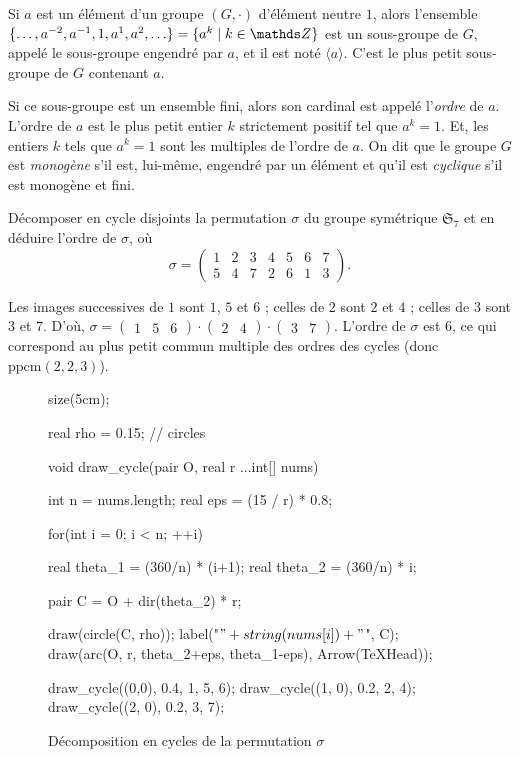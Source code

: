 Si $a$ est un élément d'un groupe $(G, \cdot)$ d'élément neutre $1$, alors l'ensemble  $\{\ldots, a^{-2}, a^{-1}, 1, a^1, a^2, \ldots\} = \{a^k  \mid k \in \Z\}$ est un sous-groupe de $G$, appelé le sous-groupe engendré par $a$, et il est noté $\langle a\rangle$. C'est le plus petit sous-groupe de $G$ contenant $a$.

Si ce sous-groupe est un ensemble fini, alors son cardinal est appelé l'\textit{ordre} de $a$. L'ordre de $a$ est le plus petit entier $k$ strictement positif tel que $a^k = 1$. Et, les entiers $k$ tels que $a^k = 1$ sont les multiples de l'ordre de $a$. On dit que le groupe $G$ est \textit{monogène} s'il est, lui-même, engendré par un élément et qu'il est \textit{cyclique} s'il est monogène et fini.

\begin{exo}
	\begin{slshape}
		Décomposer en cycle disjoints la permutation $\sigma$ du groupe symétrique $\mathfrak{S}_7$ et en déduire l'ordre de $\sigma$, où \[
			\sigma = \begin{pmatrix}
				1 & 2 & 3 & 4 & 5 & 6 & 7\\
				5 & 4 & 7 & 2 & 6 & 1 & 3
			\end{pmatrix}
		.\]
	\end{slshape}

	Les images successives de $1$ sont $1$, $5$ et $6$ ; celles de $2$ sont $2$ et $4$ ; celles de $3$ sont $3$ et $7$.
	D'où, $\sigma = \begin{pmatrix}
		1 & 5 & 6
	\end{pmatrix} \cdot \begin{pmatrix}
		2 & 4
	\end{pmatrix} \cdot \begin{pmatrix}
		3 & 7
	\end{pmatrix}$.
	L'ordre de $\sigma$ est 6, ce qui correspond au plus petit commun multiple des ordres des cycles (donc $\mathrm{ppcm}(2, 2, 3)$).

	\begin{figure}[H]
		\centering
		\begin{asy}
size(5cm);

real rho = 0.15; // circles

void draw_cycle(pair O, real r ...int[] nums) {
	int n = nums.length;
	real eps = (15 / r) * 0.8;

	for(int i = 0; i < n; ++i) {
		real theta_1 = (360/n) * (i+1);
		real theta_2 = (360/n) * i;

		pair C = O + dir(theta_2) * r;

		draw(circle(C, rho));
		label("$" + string(nums[i]) + "$", C);
		draw(arc(O, r, theta_2+eps, theta_1-eps), Arrow(TeXHead));
	}
}

draw_cycle((0,0), 0.4, 1, 5, 6);
draw_cycle((1, 0), 0.2, 2, 4);
draw_cycle((2, 0), 0.2, 3, 7);
		\end{asy}
		\caption{Décomposition en cycles de la permutation $\sigma$}
	\end{figure}
\end{exo}

